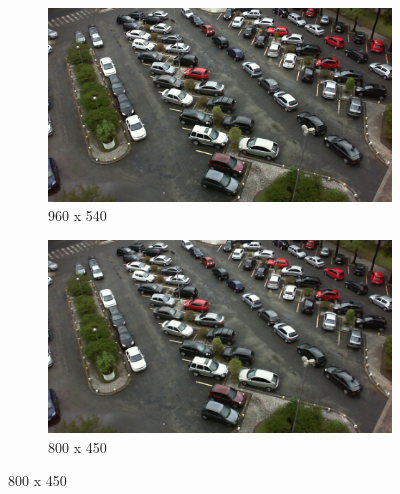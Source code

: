\begin{figure}[H]
    \bigskip
    \begin{subfigure}{.5\textwidth}
        \centering
        \includegraphics[width=.85\linewidth]{img/conception/image_process/downsample_only/5.png}
        \caption{960 x 540}   
    \end{subfigure}%
    \begin{subfigure}{.5\textwidth}
        \centering
        \includegraphics[width=.85\linewidth]{img/conception/image_process/downsample_only/4.png}
        \caption{800 x 450}
    \end{subfigure}%


\end{figure}
